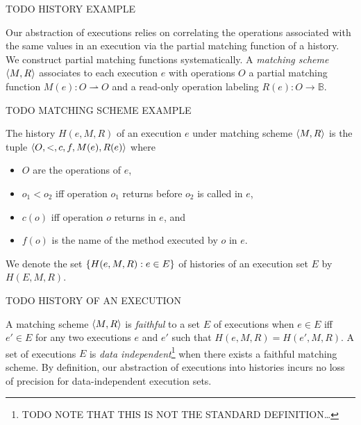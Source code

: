 \begin{example}

  TODO HISTORY EXAMPLE

\end{example}

Our abstraction of executions relies on correlating the operations associated
with the same values in an execution via the partial matching function of a
history. We construct partial matching functions systematically. A
\emph{matching scheme} ${\left\langle{M,R}\right\rangle}$ associates to each execution $e$ with
operations $O$ a partial matching function $M(e): O \rightharpoonup O$ and a
read-only operation labeling $R(e): O \to \mathbb{B}$.

\begin{example}

  TODO MATCHING SCHEME EXAMPLE

\end{example}

The history $H(e,M,R)$ of an execution $e$ under matching scheme ${\left\langle{M,R}\right\rangle}$ is
the tuple ${\left\langle{O,<,c,f,M(e),R(e)}\right\rangle}$ where
\begin{itemize}

  \item $O$ are the operations of $e$,

  \item $o_1 < o_2$ if{f} operation $o_1$ returns before $o_2$ is called in $e$,

  \item $c(o)$ if{f} operation $o$ returns in $e$, and

  \item $f(o)$ is the name of the method executed by $o$ in $e$.

\end{itemize}
We denote the set ${\{{H(e,M,R) : e \in E}\}}$ of histories of an execution set
$E$ by $H(E,M,R)$.

\begin{example}

  TODO HISTORY OF AN EXECUTION

\end{example}

A matching scheme ${\left\langle{M,R}\right\rangle}$ is \emph{faithful} to a set $E$ of executions
when $e \in E$ if{f} $e' \in E$ for any two executions $e$ and $e'$ such that
$H(e,M,R) = H(e',M,R)$. A set of executions $E$ is \emph{data
independent}\footnote{TODO NOTE THAT THIS IS NOT THE STANDARD DEFINITION…} when
there exists a faithful matching scheme. By definition, our abstraction of
executions into histories incurs no loss of precision for data-independent
execution sets.

